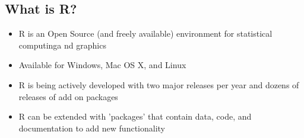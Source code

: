 \documentclass[12pt,handout]{beamer}
\begin{document}
\subsection{What is R?}
\label{sec:what-r}

\begin{frame}
  \begin{itemize}
  \item R is an Open Source (and freely available) environment for statistical computinga nd graphics
  \item Available for Windows, Mac OS X, and Linux
  \item R is being actively developed with two major releases per year and dozens of releases of add on packages
  \item R can be extended with 'packages' that contain data, code, and documentation to add new functionality
  \end{itemize}
\end{frame}
\end{document}
